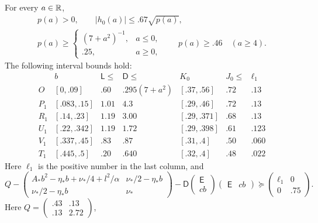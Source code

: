 \begin{lemma}\label{sc:bounds}
For every $a\in\mathbb R$,
\begin{equation}\label{sc:p-h-bounds}
 \begin{gathered}
 p(a)>0,\qquad |h_0(a)|\le .67\sqrt{p(a)},\\
 p(a)\ge\begin{cases}(7+a^2)^{-1},&a\le0,\\ .25,&a\ge0,\end{cases}
 \qquad p(a)\ge .46\quad(a\ge4).
 \end{gathered}
\end{equation}
The following interval bounds hold:
\begin{equation}\label{sc:interval-table}
\begin{array}{c|cccccc}
 &b&\mathsf L\le&\mathsf D\le&K_0&J_0\le&\ell_1\\\hline
 O &[0,.09]&.60&.295(7+a^2)&[.37,.56]&.72&.13\\
 P_1 &[.083,.15]&1.01&4.3&[.29,.46]&.72&.13\\
 R_1 &[.14,.23]&1.19&3.00&[.29,.371]&.68&.13\\
 U_1 &[.22,.342]&1.19&1.72&[.29,.398]&.61&.123\\
 V_1 &[.337,.45]&.83&.87&[.31,.4]&.50&.060\\
 T_1 &[.445,.5]&.20&.640&[.32,.4]&.48&.022
\end{array}
\end{equation}
Here $\ell_1$ is the positive number in the last column, and
\begin{equation}\label{sc:local-surplus}
 Q-
 \begin{pmatrix}
 A_*b^2-\eta_*b+\nu_*/4+l^2/\alpha&\nu_*/2-\eta_*b\\
 \nu_*/2-\eta_*b&\nu_*
 \end{pmatrix}
 -\mathsf D
 \begin{pmatrix}\mathsf E\\cb\end{pmatrix}
 \begin{pmatrix}\mathsf E&cb\end{pmatrix}
 \succeq\begin{pmatrix}\ell_1&0\\0&.75\end{pmatrix}.
\end{equation}
Here $Q=\left(\begin{smallmatrix}.43&.13\\.13&2.72\end{smallmatrix}\right)$,

\end{lemma}
